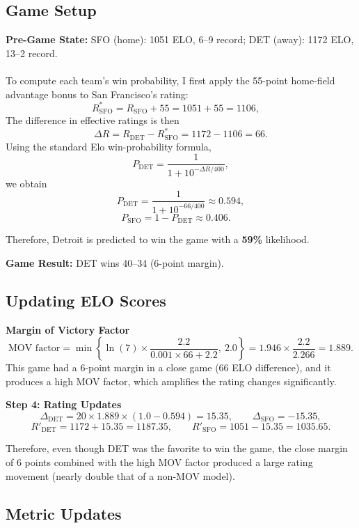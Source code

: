 \documentclass[a4paper,10.5pt,twoside]{article}
\begin{document}
\subsection{Game Setup}

\textbf{Pre-Game State:} SFO (home): 1051 ELO, 6--9 record; DET (away): 1172 ELO, 13--2 record.\\
\\

To compute each team's win probability, I first apply the 55-point home-field advantage bonus to San Francisco's rating:
\[
R_{\text{SFO}}^{\ast} = R_{\text{SFO}} + 55 = 1051 + 55 = 1106, 
\quad
\]
The difference in effective ratings is then
\[
\Delta R = R_{\text{DET}} - R_{\text{SFO}}^{\ast} = 1172 - 1106 = 66.
\]
Using the standard Elo win-probability formula,
\[
P_{\text{DET}} = \frac{1}{1 + 10^{-\Delta R / 400}},
\]
we obtain
\[
P_{\text{DET}} = \frac{1}{1 + 10^{-66/400}} \approx 0.594,
\]
\[
P_{\text{SFO}} = 1 - P_{\text{DET}} \approx 0.406. \quad
\]

Therefore, Detroit is predicted to win the game with a \textbf{59\%} likelihood. 

\textbf{Game Result:} DET wins 40--34 (6-point margin).

\subsection{Updating ELO Scores}

\textbf{Margin of Victory Factor}
\[
\text{MOV factor} = \min\left\{\ln(7) \times \frac{2.2}{0.001 \times 66 + 2.2},\ 2.0\right\} = 1.946 \times \frac{2.2}{2.266} = 1.889.
\]
This game had a 6-point margin in a close game (66 ELO difference), and it produces a high MOV factor, which amplifies the rating changes significantly. 

\textbf{Step 4: Rating Updates}
\[
\Delta_{\text{DET}} = 20 \times 1.889 \times (1.0 - 0.594) = 15.35,\qquad \Delta_{\text{SFO}} = -15.35,
\]
\[
R'_{\text{DET}} = 1172 + 15.35 = 1187.35,\qquad R'_{\text{SFO}} = 1051 - 15.35 = 1035.65.
\]

Therefore, even though DET was the favorite to win the game, the close margin of 6 points combined with the high MOV factor produced a large rating movement (nearly double that of a non-MOV model).

\subsection{Metric Updates}
\end{document}
